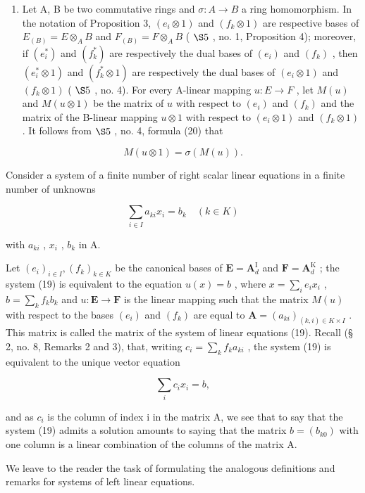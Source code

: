 \begin{enumerate}
\def\labelenumi{(\arabic{enumi})}
\setcounter{enumi}{2}
\tightlist
\item
  Let A, B be two commutative rings and \(\sigma: A \to B\) a ring homomorphism. In the notation of Proposition 3, \((e_i \otimes 1)\) and \((f_k \otimes 1)\) are respective bases of \(E_{(B)} = E \otimes_A B\) and \(F_{(B)} = F \otimes_A B\) ( \(\S 5\) , no. 1, Proposition 4); moreover, if \((e_i^*)\) and \((f_k^*)\) are respectively the dual bases of \((e_i)\) and \((f_k)\) , then \((e_i^* \otimes 1)\) and \((f_k^* \otimes 1)\) are respectively the dual bases of \((e_i \otimes 1)\) and \((f_k \otimes 1)\) ( \(\S 5\) , no. 4). For every A-linear mapping \(u: E \to F\) , let \(M(u)\) and \(M(u \otimes 1)\) be the matrix of \(u\) with respect to \((e_i)\) and \((f_k)\) and the matrix of the B-linear mapping \(u \otimes 1\) with respect to \((e_i \otimes 1)\) and \((f_k \otimes 1)\) . It follows from \(\S 5\) , no. 4, formula (20) that
\end{enumerate}

\[
M (u \otimes 1) = \sigma (M (u)).
\]

Consider a system of a finite number of right scalar linear equations in a finite number of unknowns

\[
\sum_ {i \in I} a _ {k i} x _ {i} = b _ {k} \quad (k \in K)\tag{19}
\]

with \(a_{ki}\) , \(x_{i}\) , \(b_{k}\) in A.

Let \((e_i)_{i\in I}, (f_k)_{k\in K}\) be the canonical bases of \(\mathbf{E} = \mathbf{A}_d^{\mathrm{I}}\) and \(\mathbf{F} = \mathbf{A}_d^{\mathrm{K}}\) ; the system (19) is equivalent to the equation \(u(x) = b\) , where \(x = \sum_{i} e_i x_i\) , \(b = \sum_{k} f_k b_k\) and \(u: \mathbf{E} \to \mathbf{F}\) is the linear mapping such that the matrix \(M(u)\) with respect to the bases \((e_i)\) and \((f_k)\) are equal to \(\mathbf{A} = (a_{ki})_{(k,i)\in K\times I}\) . This matrix is called the matrix of the system of linear equations (19). Recall (§ 2, no. 8, Remarks 2 and 3), that, writing \(c_i = \sum_{k} f_k a_{ki}\) , the system (19) is equivalent to the unique vector equation

\[
\sum_ {i} c _ {i} x _ {i} = b,\tag{20}
\]

and as \(c_{i}\) is the column of index i in the matrix A, we see that to say that the system (19) admits a solution amounts to saying that the matrix \(b = (b_{k0})\) with one column is a linear combination of the columns of the matrix A.

We leave to the reader the task of formulating the analogous definitions and remarks for systems of left linear equations.

